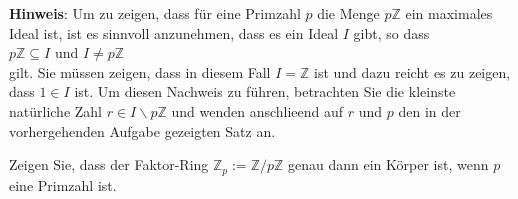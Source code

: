 \noindent
\textbf{Hinweis}: Um zu zeigen, dass f\"{u}r eine Primzahl $p$ die Menge $p\mathbb{Z}$ ein maximales
Ideal ist, ist es sinnvoll anzunehmen, dass es ein Ideal $I$
gibt, so dass
\\[0.2cm]
\hspace*{1.3cm}
$p\mathbb{Z} \subseteq I$ \quad und \quad $I \not= p\mathbb{Z}$
\\[0.2cm]
gilt.  Sie m\"{u}ssen zeigen, dass in diesem Fall $I = \mathbb{Z}$ ist und dazu reicht es zu zeigen,
dass $1 \in I$ ist.  Um diesen Nachweis zu f\"{u}hren, betrachten Sie die
kleinste nat\"{u}rliche Zahl $r \in I \backslash p\mathbb{Z}$ und wenden anschlie\3end auf $r$ und $p$
den in der vorhergehenden Aufgabe gezeigten Satz an. \exend 

\exercise
Zeigen Sie, dass der Faktor-Ring $\mathbb{Z}_p := \mathbb{Z}/p\mathbb{Z}$ genau dann ein K\"{o}rper ist,
wenn $p$ eine Primzahl ist.
\eox

